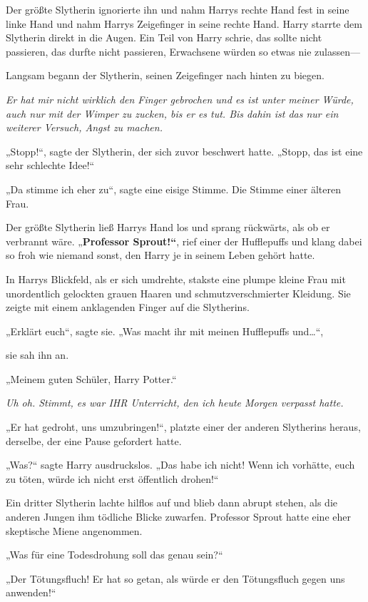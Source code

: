{Der größte Slytherin ignorierte ihn und nahm Harrys rechte Hand fest in seine linke Hand und nahm Harrys Zeigefinger in seine rechte Hand. Harry starrte dem Slytherin direkt in die Augen. Ein Teil von Harry schrie, das sollte nicht passieren, das durfte nicht passieren, Erwachsene würden so etwas nie zulassen—

Langsam begann der Slytherin, seinen Zeigefinger nach hinten zu biegen.

\emph{Er hat mir nicht wirklich den Finger gebrochen und es ist unter meiner Würde, auch nur mit der Wimper zu zucken, bis er es tut. Bis dahin ist das nur ein weiterer Versuch, Angst zu machen.}

„Stopp!“, sagte der Slytherin, der sich zuvor beschwert hatte. „Stopp, das ist eine sehr schlechte Idee!“

„Da stimme ich eher zu“, sagte eine eisige Stimme. Die Stimme einer älteren Frau.

Der größte Slytherin ließ Harrys Hand los und sprang rückwärts, als ob er verbrannt wäre. „\textbf{Professor Sprout!“}, rief einer der Hufflepuffs und klang dabei so froh wie niemand sonst, den Harry je in seinem Leben gehört hatte.

In Harrys Blickfeld, als er sich umdrehte, stakste eine plumpe kleine Frau mit unordentlich gelockten grauen Haaren und schmutzverschmierter Kleidung. Sie zeigte mit einem anklagenden Finger auf die Slytherins.

„Erklärt euch“, sagte sie. „Was macht ihr mit meinen Hufflepuffs und…“,

sie sah ihn an.

„Meinem guten Schüler, Harry Potter.“

\emph{Uh oh. Stimmt, es war IHR Unterricht, den ich heute Morgen verpasst hatte.}

„Er hat gedroht, uns umzubringen!“, platzte einer der anderen Slytherins heraus, derselbe, der eine Pause gefordert hatte.

„Was?“ sagte Harry ausdruckslos. „Das habe ich nicht! Wenn ich vorhätte, euch zu töten, würde ich nicht erst öffentlich drohen!“

Ein dritter Slytherin lachte hilflos auf und blieb dann abrupt stehen, als die anderen Jungen ihm tödliche Blicke zuwarfen. Professor Sprout hatte eine eher skeptische Miene angenommen.

„Was für eine Todesdrohung soll das genau sein?“

„Der Tötungsfluch! Er hat so getan, als würde er den Tötungsfluch gegen uns anwenden!“

}
